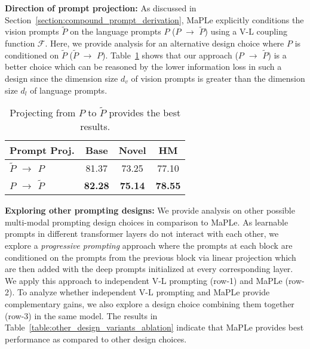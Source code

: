 \documentclass[10pt,twocolumn,letterpaper]{article}
\newcommand{\tablestyle}[2]{\setlength{\tabcolsep}{#1}\renewcommand{\arraystretch}{#2}\centering\footnotesize}
\begin{document}
\noindent \textbf{Direction of prompt projection:} As discussed in Section~\ref{section:compound_prompt_derivation}, MaPLe explicitly conditions the vision prompts $\tilde{P}$ on the language prompts $P$ ($P$ $\rightarrow$ $\tilde{P}$) using a V-L coupling function $\mathcal{F}$. Here, we provide analysis for an alternative design choice where $P$ is conditioned on $\tilde{P}$ ($\tilde{P}$ $\rightarrow$ $P$).
Table~\ref{table:ablation_projection_direction} shows that
our approach (\textit{$P$ $\rightarrow$ $\tilde{P}$}) is a better choice which can be reasoned by the lower information loss in such a design since the dimension size $d_{v}$ of vision prompts is greater than the dimension size $d_{l}$ of language prompts.

\begin{table}[t]
\tablestyle{7pt}{1.1}
\addtolength{\tabcolsep}{-1.5pt}
\centering
\begin{tabular}{l ccc}
\toprule
Prompt Proj.  & Base & Novel & HM\\
\midrule
\textbf{$\tilde{P}$ $\rightarrow$ $P$} & 81.37 & 73.25 &	77.10\\
\textbf{$P$ $\rightarrow$ $\tilde{P}$} & \textbf{82.28} &	\textbf{75.14} &	\textbf{78.55}\\
\bottomrule
\end{tabular}
\caption{Projecting from $P$ to $\tilde{P}$ provides the best results.}
\label{table:ablation_projection_direction}
\end{table}

 \noindent \textbf{Exploring other prompting designs:} 
We provide analysis on other possible multi-modal prompting design choices in comparison to MaPLe. As learnable prompts in different transformer layers do not interact with each other, we explore a \textit{progressive prompting} approach where the prompts at each block are conditioned on the prompts from the previous block via linear projection which are then added with the deep prompts initialized at every corresponding layer. We apply this approach to independent V-L prompting (row-1) and MaPLe (row-2). To analyze whether independent V-L prompting and MaPLe provide complementary gains, we also explore a design choice combining them together (row-3) in the same model. The results in Table~\ref{table:other_design_variants_ablation} indicate that MaPLe provides best performance as compared to other design choices.  
\end{document}
